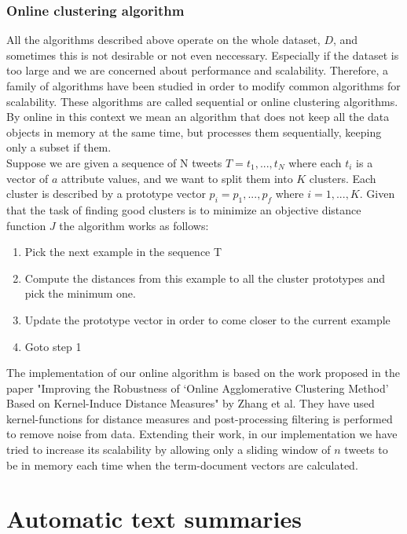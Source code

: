 \subsubsection{Online clustering algorithm}
All the algorithms described above operate on the whole dataset, $D$, and sometimes this is not desirable or not even neccessary. Especially if the dataset is too large and we are concerned about performance and scalability. Therefore, a family of algorithms have been studied in order to modify common algorithms for scalability. These algorithms are called sequential or online clustering algorithms. By online in this context we mean an algorithm that does not keep all the data objects in memory at the same time, but processes them sequentially, keeping only a subset if them.\\
Suppose we are given a sequence of N tweets $T = {t_1, ..., t_N}$ where each $t_i$ is a vector of $a$ attribute values, and we want to split them into $K$ clusters. Each cluster is described by a prototype vector $p_i = {p_1, ..., p_f}$ where $i = 1, ..., K$. Given that the task of finding good clusters is to minimize an objective distance function $J$ the algorithm works as follows:
\begin{enumerate}
   \item Pick the next example in the sequence T
   \item Compute the distances from this example to all the cluster prototypes and pick the minimum one.
   \item Update the prototype vector in order to come closer to the current example  
   \item Goto step 1  
 \end{enumerate} 
 
The implementation of our online algorithm is based on the work proposed in the paper "Improving the Robustness of ‘Online Agglomerative Clustering Method’ Based on Kernel-Induce Distance Measures" by Zhang et al. They have used kernel-functions for distance measures and post-processing filtering is performed to remove noise from data. Extending their work, in our implementation we have tried to increase its scalability by allowing only a sliding window of $n$ tweets to be in memory each time when the term-document vectors are calculated. 

\section{Automatic text summaries}\label{SummaryGen}

